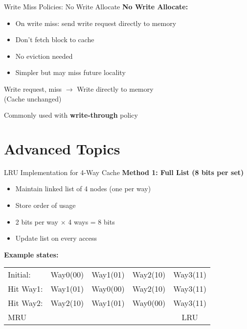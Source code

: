\documentclass[aspectratio=169,12pt]{beamer}
\begin{document}
\begin{frame}{Write Miss Policies: No Write Allocate}
\textbf{No Write Allocate:}
\begin{itemize}
    \item On write miss: send write request directly to memory
    \item Don't fetch block to cache
    \item No eviction needed
    \item Simpler but may miss future locality
\end{itemize}

\begin{center}
\begin{tcolorbox}[colback=orange!10, width=0.7\textwidth]
Write request, miss $\rightarrow$ Write directly to memory\\
(Cache unchanged)
\end{tcolorbox}
\end{center}

Commonly used with \textbf{write-through} policy
\end{frame}

\section{Advanced Topics}
\begin{frame}{LRU Implementation for 4-Way Cache}
\textbf{Method 1: Full List (8 bits per set)}
\begin{itemize}
    \item Maintain linked list of 4 nodes (one per way)
    \item Store order of usage
    \item 2 bits per way $\times$ 4 ways = 8 bits
    \item Update list on every access
\end{itemize}

\textbf{Example states:}
\begin{center}
\begin{tabular}{|l|c|c|c|c|}
\hline
Initial: & Way0(00) & Way1(01) & Way2(10) & Way3(11) \\
Hit Way1: & Way1(01) & Way0(00) & Way2(10) & Way3(11) \\
Hit Way2: & Way2(10) & Way1(01) & Way0(00) & Way3(11) \\
\hline
\multicolumn{2}{|l}{MRU} & & & LRU \\
\hline
\end{tabular}
\end{center}
\end{frame}
\end{document}
